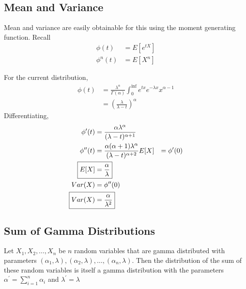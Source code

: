 \documentclass[../probability-notes.tex]{subfiles}
\begin{document}
    \subsection{Mean and Variance}
    Mean and variance are easily obtainable for this using the moment generating function. Recall
    \begin{align*}
        \phi(t) &= E[e^{tX}]\\
        \phi^{n}(t) &= E[X^{n}]
    \end{align*}

    For the current distribution,
    \begin{align*}
        \phi(t) &= \frac{\lambda^{\alpha}}{\Gamma(\alpha)} \int_{0}^{\inf} e^{tx} e^{-\lambda x} x^{\alpha - 1}\\
        &= (\frac{\lambda}{\lambda - t})^{\alpha}
    \end{align*}
    Differentiating,
    \begin{align*}
        \phi^{\prime}(t) &= \frac{\alpha \lambda^{\alpha}}{(\lambda - t)^{\alpha + 1}}\\
        \phi^{\prime \prime}(t) &= \frac{\alpha(\alpha + 1)\lambda^{\alpha}}{(\lambda - t)^{\alpha + 2}}
        \newline
        E[X] &= \phi^{\prime}(0)\\
        \Aboxed{E[X] &= \frac{\alpha}{\lambda}}\\
        Var(X) &= \phi^{\prime \prime}(0)\\
        \Aboxed{Var(X) &= \frac{\alpha}{\lambda^{2}}}
    \end{align*}

    \subsection{Sum of Gamma Distributions}
    Let $X_{1}, X_{2}, \ldots, X_{n}$ be $n$ random variables that are gamma distributed with parameters \newline$(\alpha_{1}, \lambda), (\alpha_{2}, \lambda), \ldots, (\alpha_{n}, \lambda)$. Then the distribution of the sum of these random variables is itself a gamma distribution with the parameters $\alpha^{\prime} = \sum_{i=1}^{n} \alpha_{i}$ and $\lambda^{\prime} = \lambda$
\end{document}
